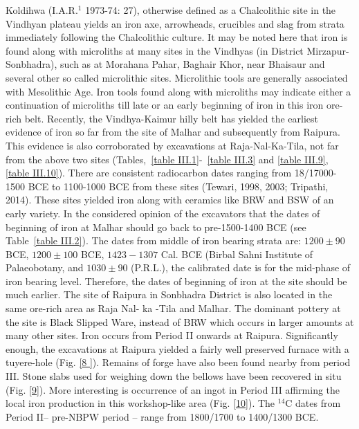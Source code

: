 Koldihwa (I.A.R.$^{1}$ 1973-74: 27), otherwise defined as a Chalcolithic site in the Vindhyan plateau yields an iron axe, arrowheads, crucibles and slag from strata immediately following the Chalcolithic culture. It may be noted here that iron is found along with microliths at many sites in the Vindhyas (in District Mirzapur-Sonbhadra), such as at Morahana Pahar, Baghair Khor, near Bhaisaur and several other so called microlithic sites. Microlithic tools are generally associated with Mesolithic Age. Iron tools found along with microliths may indicate either a continuation of microliths till late or an early beginning of iron in this iron ore-rich belt. Recently, the Vindhya-Kaimur hilly belt has yielded the earliest evidence of iron so far from the site of Malhar and subsequently from Raipura. This evidence is also corroborated by excavations at Raja-Nal-Ka-Tila, not far from the above two sites (Tables,~\ref{table III.1}-~\ref{table III.3} and \ref{table III.9}, \ref{table III.10}). There are consistent radiocarbon dates ranging from 18/17000-1500 BCE to 1100-1000 BCE from these sites (Tewari, 1998, 2003; Tripathi, 2014). These sites yielded iron along with ceramics like BRW and BSW of an early variety. In the considered opinion of the excavators that the dates of beginning of iron at Malhar should go back to pre-1500-1400 BCE (see Table~\ref{table III.2}). The dates from middle of iron bearing strata are: $1200\pm 90$ BCE, $1200\pm100$ BCE, $1423-1307$ Cal. BCE (Birbal Sahni Institute of Palaeobotany, and $1030\pm 90$ (P.R.L.), the calibrated date is for the mid-phase of iron bearing level. Therefore, the dates of beginning of iron at the site should be much earlier. The site of Raipura in Sonbhadra District is also located in the same ore-rich area as Raja Nal- ka -Tila and Malhar. The dominant pottery at the site is Black Slipped Ware, instead of BRW which occurs in larger amounts at many other sites. Iron occurs from Period II onwards at Raipura. Significantly enough, the excavations at Raipura yielded a fairly well preserved furnace with a tuyere-hole (Fig. \ref{8	}). Remains of forge have also been found nearby from period III. Stone slabs used for weighing down the bellows have been recovered in situ (Fig. \ref{9}). More interesting is occurrence of an ingot in Period III affirming the local iron production in this workshop-like area (Fig. \ref{10}). The ${}^{14}$C dates from Period II– pre-NBPW period – range from 1800/1700 to 1400/1300 BCE.

